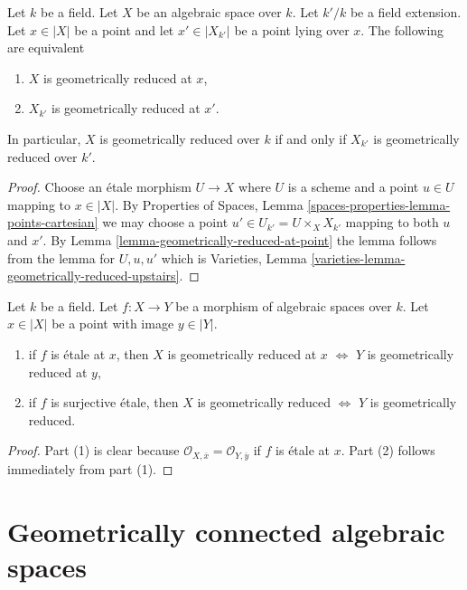 \begin{lemma}
\label{lemma-geometrically-reduced-upstairs}
Let $k$ be a field. Let $X$ be an algebraic space over $k$.
Let $k'/k$ be a field extension. Let $x \in |X|$ be a point and let
$x' \in |X_{k'}|$ be a point lying over $x$.
The following are equivalent
\begin{enumerate}
\item $X$ is geometrically reduced at $x$,
\item $X_{k'}$ is geometrically reduced at $x'$.
\end{enumerate}
In particular, $X$ is geometrically reduced over $k$ if and only if
$X_{k'}$ is geometrically reduced over $k'$.
\end{lemma}

\begin{proof}
Choose an \'etale morphism $U \to X$ where $U$ is a scheme
and a point $u \in U$ mapping to $x \in |X|$.
By Properties of Spaces, Lemma \ref{spaces-properties-lemma-points-cartesian}
we may choose a point $u' \in U_{k'} = U \times_X X_{k'}$ mapping
to both $u$ and $x'$. By Lemma \ref{lemma-geometrically-reduced-at-point}
the lemma follows from the lemma for $U, u, u'$ which is
Varieties, Lemma \ref{varieties-lemma-geometrically-reduced-upstairs}.
\end{proof}

\begin{lemma}
\label{lemma-geometrically-reduced-etale-local}
Let $k$ be a field. Let $f : X \to Y$ be a morphism of
algebraic spaces over $k$. Let $x \in |X|$ be a point
with image $y \in |Y|$.
\begin{enumerate}
\item if $f$ is \'etale at $x$, then
$X$ is geometrically reduced at $x$ $\Leftrightarrow$
$Y$ is geometrically reduced at $y$,
\item if $f$ is surjective \'etale, then
$X$ is geometrically reduced $\Leftrightarrow$
$Y$ is geometrically reduced.
\end{enumerate}
\end{lemma}

\begin{proof}
Part (1) is clear because
$\mathcal{O}_{X, \overline{x}} = \mathcal{O}_{Y, \overline{y}}$
if $f$ is \'etale at $x$.
Part (2) follows immediately from part (1).
\end{proof}






\section{Geometrically connected algebraic spaces}
\label{section-geometrically-connected}

